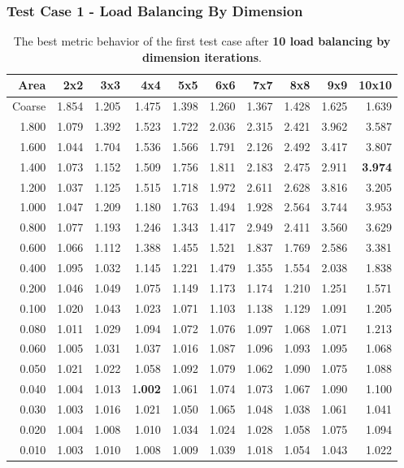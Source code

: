\documentclass[compress]{beamer}
\begin{document}
\begin{frame}[t]\frametitle{Test Case 1 - Load Balancing By Dimension}
\begin{table}[H]
\tiny
\centering
\caption{The best metric behavior of the first test case after \textbf{10 load balancing by dimension iterations}.} 
\begin{tabular}{rrrrrrrrrr}
 \hline
 Area & 2x2 &3x3 & 4x4 & 5x5 & 6x6 & 7x7 &8x8 & 9x9 & 10x10 \\ 
\hline
 Coarse & 1.854 & 1.205 & 1.475 & 1.398 & 1.260 & 1.367 & 1.428 & 1.625 & 1.639 \\
  1.800 & 1.079 & 1.392 & 1.523 & 1.722 & 2.036 & 2.315 & 2.421 & 3.962 & 3.587 \\
  1.600 & 1.044 & 1.704 & 1.536 & 1.566 & 1.791 & 2.126 & 2.492 & 3.417 & 3.807 \\
  1.400 & 1.073 & 1.152 & 1.509 & 1.756 & 1.811 & 2.183 & 2.475 & 2.911 & \textbf{\cellcolor{blue!25}3.974} \\
  1.200 & 1.037 & 1.125 & 1.515 & 1.718 & 1.972 & 2.611 & 2.628 & 3.816 & 3.205 \\
  1.000 & 1.047 & 1.209 & 1.180 & 1.763 & 1.494 & 1.928 & 2.564 & 3.744 & 3.953 \\
  0.800 & 1.077 & 1.193 & 1.246 & 1.343 & 1.417 & 2.949 & 2.411 & 3.560 & 3.629 \\
  0.600 & 1.066 & 1.112 & 1.388 & 1.455 & 1.521 & 1.837 & 1.769 & 2.586 & 3.381 \\
  0.400 & 1.095 & 1.032 & 1.145 & 1.221 & 1.479 & 1.355 & 1.554 & 2.038 & 1.838 \\
  0.200 & 1.046 & 1.049 & 1.075 & 1.149 & 1.173 & 1.174 & 1.210 & 1.251 & 1.571 \\
  0.100 & 1.020 & 1.043 & 1.023 & 1.071 & 1.103 & 1.138 & 1.129 & 1.091 & 1.205 \\
  0.080 & 1.011 & 1.029 & 1.094 & 1.072 & 1.076 & 1.097 & 1.068 & 1.071 & 1.213 \\
  0.060 & 1.005 & 1.031 & 1.037 & 1.016 & 1.087 & 1.096 & 1.093 & 1.095 & 1.068 \\
  0.050 & 1.021 & 1.022 & 1.058 & 1.092 & 1.079 & 1.062 & 1.090 & 1.075 & 1.088 \\
  0.040 & 1.004 & 1.013 & 1\textbf{\cellcolor{blue!25}.002} & 1.061 & 1.074 & 1.073 & 1.067 & 1.090 & 1.100 \\
  0.030 & 1.003 & 1.016 & 1.021 & 1.050 & 1.065 & 1.048 & 1.038 & 1.061 & 1.041 \\
  0.020 & 1.004 & 1.008 & 1.010 & 1.034 & 1.024 & 1.028 & 1.058 & 1.075 & 1.094 \\
  0.010 & 1.003 & 1.010 & 1.008 & 1.009 & 1.039 & 1.018 & 1.054 & 1.043 & 1.022 \\
\hline
\end{tabular}
\end{table}
\end{frame}
\end{document}
